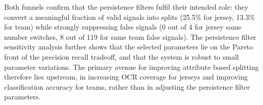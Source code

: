 Both funnels confirm that the persistence filters fulfil their intended role: they convert a meaningful fraction of valid signals into splits (25.5\% for jersey, 13.3\% for team) while strongly suppressing false signals (0 out of 4 for jersey same number switches, 8 out of 119 for same team false signals). The persistence filter sensitivity analysis further shows that the selected parameters lie on the Pareto front of the precision recall tradeoff, and that the system is robust to small parameter variations. The primary avenue for improving attribute based splitting therefore lies upstream, in increasing OCR coverage for jerseys and improving classification accuracy for teams, rather than in adjusting the persistence filter parameters.
